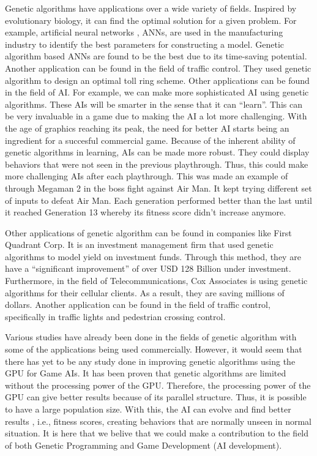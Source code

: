 Genetic algorithms have applications over a wide variety of fields.
Inspired by evolutionary biology, it can find the optimal solution
for a given problem.  For example, artificial neural networks , ANNs, are used in the manufacturing
industry to identify the best parameters for constructing a model.  Genetic 
algorithm based ANNs are found to be the best due to its time-saving potential\cite{Venkatesan08}.  
Another application can be found in the field of traffic control.  They used genetic algorithm to design an
optimal toll ring scheme\cite{Sumalee08}.
Other applications can be found in the field of AI.  For example, we can 
make more sophisticated AI using genetic algorithms.  These AIs will be smarter in the 
sense that it can ``learn''.  This can be very invaluable in a game due to making the AI a lot more challenging.  
With the age of graphics reaching its peak, the need for better AI starts being an
ingredient for a succesful commercial game\cite{Yue06}.  Because of the inherent ability
of genetic algorithms in learning, AIs can be made more robust.  They could 
display behaviors that were not seen in the previous playthrough.  Thus, 
this could make more challenging AIs after each playthrough.  This was made an 
example of through Megaman 2 in the boss fight against Air Man.  It kept trying different 
set of inputs to defeat Air Man.  Each generation performed better than the last 
until it reached Generation 13 whereby its fitness score didn't increase anymore\cite{website:Kuliniewicz09}.  


Other applications of genetic algorithm can be found in companies like First Quadrant Corp.
It is an investment management firm that used genetic algorithms to model yield on 
investment funds\cite{website:Davis}.  Through this method, they are have a ``significant improvement''
of over USD 128 Billion under investment\cite{website:Davis}.  Furthermore, in the field of Telecommunications, 
Cox Associates is using genetic algorithms for their cellular clients\cite{website:Davis}.  
As a result, they are saving millions of dollars.  Another application can be found 
in the field of traffic control, specifically in traffic lights and pedestrian crossing
control\cite{Turky09}.  

Various studies have already been done in the fields of genetic algorithm with some of the applications
being used commercially.
However, it would seem that there has yet to be any study done in improving genetic algorithms
using the GPU for Game AIs.  It has been proven that genetic algorithms are limited without
the processing power of the GPU\cite{Banzhaf09}.  Therefore, the processing power of the GPU can give better 
results because of its parallel structure.  Thus, it is possible to have a large population size.
With this, the AI can evolve and find better results , i.e., fitness scores, creating behaviors that are normally
unseen in normal situation.  It is here that we belive that we 
could make a contribution to the field of both Genetic Programming and Game Development (AI development).